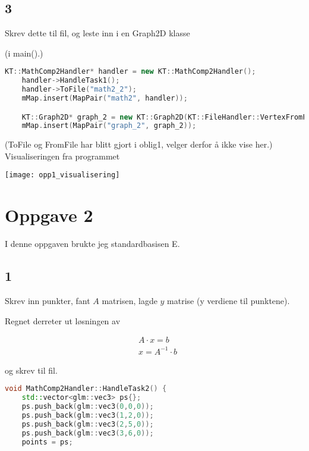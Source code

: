 ﻿\documentclass[14]{article}
\begin{document}
\begin{flushleft}
        \subsection*{3}
        
        Skrev dette til fil, og leste inn i en Graph2D klasse

        (i main().)
        \begin{lstlisting}[language=C++, caption=Funksjon som genererer punktene]
    KT::MathComp2Handler* handler = new KT::MathComp2Handler(); 
    handler->HandleTask1();
    handler->ToFile("math2_2");
    mMap.insert(MapPair("math2", handler));

    KT::Graph2D* graph_2 = new KT::Graph2D(KT::FileHandler::VertexFromFile("math2_2"));
    mMap.insert(MapPair("graph_2", graph_2));

        \end{lstlisting}
        (ToFile og FromFile har blitt gjort i oblig1, velger derfor å ikke vise her.)
        Visualiseringen fra programmet
        
        \texttt{[image: opp1\_visualisering]}

        \section{Oppgave 2}
        I denne oppgaven brukte jeg standardbasisen E.
        \subsection*{1}
        
        Skrev inn punkter, fant \(A\) matrisen, lagde \(y\) matrise (y verdiene til punktene). 
        
        Regnet derreter ut løsningen av
        
        \begin{align*}
            & A\cdot x = b \\
            & x = A^{-1}\cdot b
        \end{align*}
        
        og skrev til fil.
        
        \begin{lstlisting}[language=C++, caption=Oppgave 2 numerisk utregning]
void MathComp2Handler::HandleTask2() {
    std::vector<glm::vec3> ps{};
    ps.push_back(glm::vec3(0,0,0));
    ps.push_back(glm::vec3(1,2,0));
    ps.push_back(glm::vec3(2,5,0));
    ps.push_back(glm::vec3(3,6,0));
    points = ps;


\end{lstlisting}
\end{flushleft}
\end{document}
